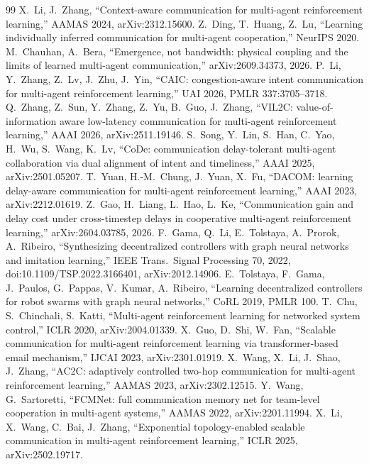 \documentclass[11pt]{article}
\theoremstyle{definition}
\begin{document}
\begin{thebibliography}{99}
 X.~Li, J.~Zhang, ``Context-aware communication for multi-agent reinforcement learning,'' AAMAS 2024,
arXiv:2312.15600.
 Z.~Ding, T.~Huang, Z.~Lu, ``Learning individually inferred communication for multi-agent cooperation,''
NeurIPS 2020.
 M.~Chauhan, A.~Bera, ``Emergence, not bandwidth: physical coupling and the limits of learned
multi-agent communication,'' arXiv:2609.34373, 2026.
 P.~Li, Y.~Zhang, Z.~Lv, J.~Zhu, J.~Yin, ``CAIC: congestion-aware intent communication for multi-agent
reinforcement learning,'' UAI 2026, PMLR 337:3705--3718.
 Q.~Zhang, Z.~Sun, Y.~Zhang, Z.~Yu, B.~Guo, J.~Zhang, ``VIL2C: value-of-information aware low-latency
communication for multi-agent reinforcement learning,'' AAAI 2026, arXiv:2511.19146.
 S.~Song, Y.~Lin, S.~Han, C.~Yao, H.~Wu, S.~Wang, K.~Lv, ``CoDe: communication delay-tolerant multi-agent
collaboration via dual alignment of intent and timeliness,'' AAAI 2025, arXiv:2501.05207.
 T.~Yuan, H.-M.~Chung, J.~Yuan, X.~Fu, ``DACOM: learning delay-aware communication for multi-agent
reinforcement learning,'' AAAI 2023, arXiv:2212.01619.
 Z.~Gao, H.~Liang, L.~Hao, L.~Ke, ``Communication gain and delay cost under cross-timestep delays in
cooperative multi-agent reinforcement learning,'' arXiv:2604.03785, 2026.
 F.~Gama, Q.~Li, E.~Tolstaya, A.~Prorok, A.~Ribeiro, ``Synthesizing decentralized controllers with graph
neural networks and imitation learning,'' IEEE Trans.\ Signal Processing 70, 2022, doi:10.1109/TSP.2022.3166401,
arXiv:2012.14906.
 E.~Tolstaya, F.~Gama, J.~Paulos, G.~Pappas, V.~Kumar, A.~Ribeiro, ``Learning decentralized
controllers for robot swarms with graph neural networks,'' CoRL 2019, PMLR 100.
 T.~Chu, S.~Chinchali, S.~Katti, ``Multi-agent reinforcement learning for networked system control,''
ICLR 2020, arXiv:2004.01339.
 X.~Guo, D.~Shi, W.~Fan, ``Scalable communication for multi-agent reinforcement learning via
transformer-based email mechanism,'' IJCAI 2023, arXiv:2301.01919.
 X.~Wang, X.~Li, J.~Shao, J.~Zhang, ``AC2C: adaptively controlled two-hop communication for multi-agent
reinforcement learning,'' AAMAS 2023, arXiv:2302.12515.
 Y.~Wang, G.~Sartoretti, ``FCMNet: full communication memory net for team-level cooperation in
multi-agent systems,'' AAMAS 2022, arXiv:2201.11994.
 X.~Li, X.~Wang, C.~Bai, J.~Zhang, ``Exponential topology-enabled scalable communication in
multi-agent reinforcement learning,'' ICLR 2025, arXiv:2502.19717.

\end{thebibliography}
\end{document}
